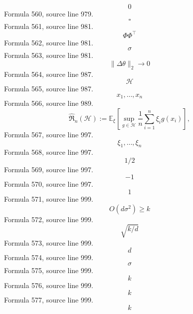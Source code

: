 \documentclass{ctexart}
\begin{document}
\[0\]
Formula 560, source line 979.
\[\square\]
Formula 561, source line 981.
\[\Phi\Phi^\top\]
Formula 562, source line 981.
\[\sigma\]
Formula 563, source line 981.
\[\|\Delta\theta\|_2\to0\]
Formula 564, source line 987.
\[\mathcal H\]
Formula 565, source line 987.
\[x_1,\ldots,x_n\]
Formula 566, source line 989.
\[
\widehat{\mathfrak R}_n(\mathcal H)
:=\mathbb E_{\xi}\left[
\sup\limits_{g\in\mathcal H}
\frac1n\sum\limits_{i=1}^{n}\xi_i g(x_i)
\right],
\]
Formula 567, source line 997.
\[\xi_1,\ldots,\xi_n\]
Formula 568, source line 997.
\[1/2\]
Formula 569, source line 997.
\[-1\]
Formula 570, source line 997.
\[1\]
Formula 571, source line 999.
\[O(d\sigma^2)\geq k\]
Formula 572, source line 999.
\[\sqrt{k/d}\]
Formula 573, source line 999.
\[d\]
Formula 574, source line 999.
\[\sigma\]
Formula 575, source line 999.
\[k\]
Formula 576, source line 999.
\[k\]
Formula 577, source line 999.
\[k\]
\end{document}
